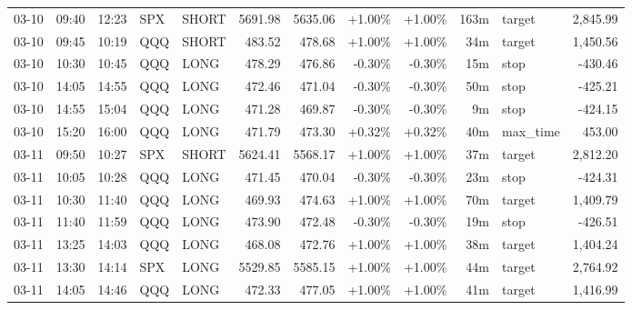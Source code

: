 \documentclass[11pt,a4paper,twoside]{article}
\begin{document}
\begin{center}
\begin{longtable}{>{\color{txtmain}}l l l l l r r r r r >{\color{txtmain}}l r}
03-10 & 09:40 & 12:23 & SPX & SHORT & 5691.98 & 5635.06 & \textcolor{wingreen}{+1.00\%} & \textcolor{wingreen}{+1.00\%} & 163m & target & \textcolor{wingreen}{2,845.99} \\
03-10 & 09:45 & 10:19 & QQQ & SHORT & 483.52 & 478.68 & \textcolor{wingreen}{+1.00\%} & \textcolor{wingreen}{+1.00\%} & 34m & target & \textcolor{wingreen}{1,450.56} \\
03-10 & 10:30 & 10:45 & QQQ & LONG & 478.29 & 476.86 & \textcolor{lossred}{-0.30\%} & \textcolor{lossred}{-0.30\%} & 15m & stop & \textcolor{lossred}{-430.46} \\
03-10 & 14:05 & 14:55 & QQQ & LONG & 472.46 & 471.04 & \textcolor{lossred}{-0.30\%} & \textcolor{lossred}{-0.30\%} & 50m & stop & \textcolor{lossred}{-425.21} \\
03-10 & 14:55 & 15:04 & QQQ & LONG & 471.28 & 469.87 & \textcolor{lossred}{-0.30\%} & \textcolor{lossred}{-0.30\%} & 9m & stop & \textcolor{lossred}{-424.15} \\
03-10 & 15:20 & 16:00 & QQQ & LONG & 471.79 & 473.30 & \textcolor{wingreen}{+0.32\%} & \textcolor{wingreen}{+0.32\%} & 40m & max\_time & \textcolor{wingreen}{453.00} \\
03-11 & 09:50 & 10:27 & SPX & SHORT & 5624.41 & 5568.17 & \textcolor{wingreen}{+1.00\%} & \textcolor{wingreen}{+1.00\%} & 37m & target & \textcolor{wingreen}{2,812.20} \\
03-11 & 10:05 & 10:28 & QQQ & LONG & 471.45 & 470.04 & \textcolor{lossred}{-0.30\%} & \textcolor{lossred}{-0.30\%} & 23m & stop & \textcolor{lossred}{-424.31} \\
03-11 & 10:30 & 11:40 & QQQ & LONG & 469.93 & 474.63 & \textcolor{wingreen}{+1.00\%} & \textcolor{wingreen}{+1.00\%} & 70m & target & \textcolor{wingreen}{1,409.79} \\
03-11 & 11:40 & 11:59 & QQQ & LONG & 473.90 & 472.48 & \textcolor{lossred}{-0.30\%} & \textcolor{lossred}{-0.30\%} & 19m & stop & \textcolor{lossred}{-426.51} \\
03-11 & 13:25 & 14:03 & QQQ & LONG & 468.08 & 472.76 & \textcolor{wingreen}{+1.00\%} & \textcolor{wingreen}{+1.00\%} & 38m & target & \textcolor{wingreen}{1,404.24} \\
03-11 & 13:30 & 14:14 & SPX & LONG & 5529.85 & 5585.15 & \textcolor{wingreen}{+1.00\%} & \textcolor{wingreen}{+1.00\%} & 44m & target & \textcolor{wingreen}{2,764.92} \\
03-11 & 14:05 & 14:46 & QQQ & LONG & 472.33 & 477.05 & \textcolor{wingreen}{+1.00\%} & \textcolor{wingreen}{+1.00\%} & 41m & target & \textcolor{wingreen}{1,416.99} \\

\end{longtable}
\end{center}
\end{document}
